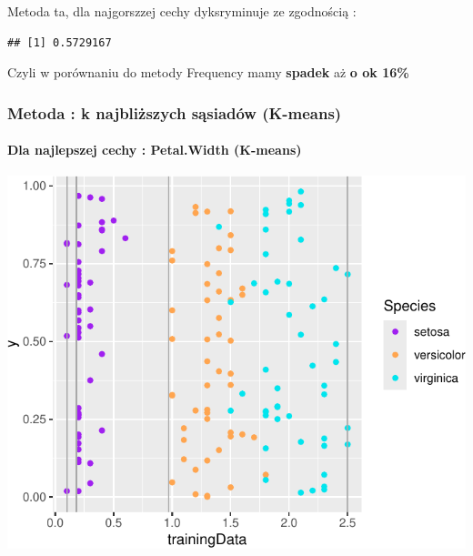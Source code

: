 \documentclass[
  12pt,
]{article}
\begin{document}
Metoda ta, dla najgorszzej cechy dyksryminuje ze zgodnością :

\begin{verbatim}
## [1] 0.5729167
\end{verbatim}

Czyli w porównaniu do metody Frequency mamy \textbf{spadek} aż \textbf{o
ok 16\%}

\subsubsection{Metoda : k najbliższych sąsiadów
(K-means)}\label{metoda-k-najbliux17cszych-sux105siaduxf3w-k-means}

\paragraph{Dla najlepszej cechy : Petal.Width
(K-means)}\label{dla-najlepszej-cechy-petal.width-k-means}

\begin{center}\includegraphics{Sprawozdanie2_files/figure-latex/kMeans_najl-1} \end{center}
\end{document}
